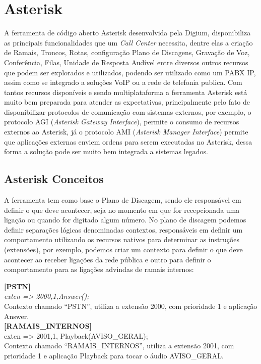 \section{Asterisk}
A ferramenta de código aberto Asterisk desenvolvida pela Digium, disponibiliza as principais funcionalidades que um \textit{Call Center} necessita, dentre elas a criação de Ramais, Troncos, Rotas, configuração Plano de Discagens, Gravação de Voz, Conferência, Filas, Unidade de Resposta Audível entre diversos outros recursos que podem ser explorados e utilizados, podendo ser utilizado como um PABX IP, assim como se integrado a soluções VoIP ou a rede de telefonia publica.
Com tantos recursos disponíveis e sendo multiplataforma a ferramenta Asterisk está muito bem preparada para atender as expectativas, principalmente pelo fato de disponibilizar protocolos de comunicação com sistemas externos, por exemplo, o protocolo AGI (\textit{Asterisk Gateway Interface}), permite o consumo de recursos externos ao Asterisk, já o protocolo AMI (\textit{Asterisk Manager Interface}) permite que aplicações externas enviem ordens para serem executadas no Asterisk, dessa forma a solução pode ser muito bem integrada a sistemas legados.


\subsection{Asterisk Conceitos}

A ferramenta tem como base o Plano de Discagem, sendo ele responsável em definir o que deve acontecer, seja no momento em que for recepcionada uma ligação ou quando for digitado algum número. No plano de discagem podemos definir separações lógicas denominadas contextos, responsáveis em definir um comportamento utilizando os recursos nativos para determinar as instruções (extensões), por exemplo, podemos criar um contexto para definir o que deve acontecer ao receber ligações da rede pública e outro para definir o comportamento para as ligações advindas de ramais internos:

\begin{flushleft}

\textbf{[PSTN]} \\
\textit{exten => 2000,1,Answer();} \\
Contexto chamado “PSTN”, utiliza a extensão 2000, com prioridade 1 e aplicação Answer.\\

\textbf{[RAMAIS\_INTERNOS]} \\
exten => 2001,1, Playback(AVISO\_GERAL); \\
Contexto chamado “RAMAIS\_INTERNOS”, utiliza a extensão 2001, com prioridade 1 e aplicação Playback para tocar o áudio AVISO\_GERAL.\\
\end{flushleft}

